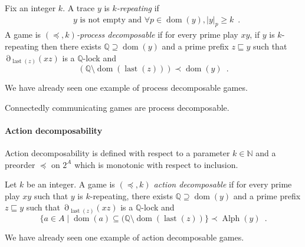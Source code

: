 \documentclass[a4paper,UKenglish]{lipics-v2016}
\newcommand{\NN}{\mathbb{N}}
\newcommand{\QQ}{\mathbb{Q}}
\newcommand{\pref}{\sqsubseteq}
\DeclareMathOperator{\dom}{dom}
\DeclareMathOperator{\view}{\partial}
\DeclareMathOperator{\last}{last}
\DeclareMathOperator{\alphabet}{Alph}
\begin{document}
\begin{definition}
Fix an integer $k$.
A trace $y$ is \emph{$k$-repeating} if 
\begin{align*}
&y \text{ is not empty and } \forall p\in\dom(y), |y|_p\geq k\enspace.
\end{align*}
A game is \emph{$(\preceq,k)$-process decomposable}
if  for every prime play $xy$,
if $y$ is $k$-repeating then
there exists $\QQ \supseteq \dom(y)$
and a prime prefix $z\pref y$
such that 
$\view_{\last(z)}(xz)$ is a  $\QQ$-lock 
and 
\begin{equation}
\label{pd}
(\QQ \setminus \dom(\last(z))) \prec \dom(y)\enspace.
\end{equation}
\end{definition}

We have already seen one example of process decomposable games.

\begin{lemma}\label{lem:pdec}
Connectedly communicating games
are process decomposable.
\end{lemma}


\paragraph*{Action decomposability}

\newcommand{\FF}{\mathcal{F}}

\newcommand{\dFF}{{\downarrow\FF}}














Action decomposability is defined with respect to a parameter $k\in \NN$
and a preorder $\preceq$ on $2^A$
which is 
monotonic with respect to inclusion.

\begin{definition}
Let $k$ be an integer.
A game is \emph{$(\preceq,k)$ action decomposable}
if  for every prime play $xy$
such that
$y$ is $k$-repeating,
there exists $\QQ \supseteq \dom(y)$
and a prime prefix $z \pref y$ such that 
$\view_{\last(z)}(xz)$ is a  $\QQ$-lock
and
\[
 \{ a \in A \mid \dom(a) \subseteq (\QQ \setminus \dom(\last(z)) \} \prec \alphabet(y)\enspace.
\]
\end{definition}



We have already seen one example of action decomposable games.
\end{document}
